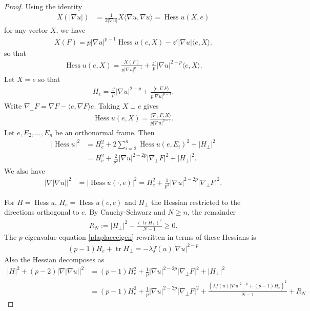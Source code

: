 \documentclass[11pt]{amsart}
\DeclareMathOperator{\Ric}{Ric}
\DeclareMathOperator{\tr}{tr}
\DeclareMathOperator{\Hess}{Hess}
\theoremstyle{definition}
\begin{document}
\begin{proof}
 Using the identity
 \begin{align*}
     X(|\nabla u|)&=\frac{1}{2|\nabla u|}X\langle \nabla u,\nabla u\rangle =\Hess u(X,e)
 \end{align*}
for any vector $X$, we have
\begin{align*}
    X(F)=p|\nabla u|^{p-1}\Hess u(e,X)-z'|\nabla u|\langle e,X\rangle. 
\end{align*}
so that
\begin{align*}
    \Hess u(e,X) = \frac{X(F)}{p|\nabla u|^{p-1}}+\frac{z'}{p}|\nabla u|^{2-p}\langle e,X\rangle.
\end{align*}
Let $X=e$ so that
\begin{align*}
    H_e =\frac{z'}{p}|\nabla u|^{2-p}+\frac{\langle e,\nabla F\rangle}{p|\nabla u|^{p-1}}.
\end{align*}
Write $\nabla_\perp F=\nabla F-\langle e,\nabla F\rangle e.$ Taking $X\perp e$ gives
\begin{align*}
    \Hess u(e,X) = \frac{\langle \nabla_\perp F,X\rangle}{p|\nabla u|^{p-1}}.
\end{align*}
Let $e,E_2,\ldots, E_n$ be an orthonormal frame.  Then
\begin{align*}
    |\Hess u|^2&=H_e^2+2\sum_{i=2}^n\Hess u(e,E_i)^2+|H_\perp|^2\\
    &=H_e^2+\frac{2}{p^2}|\nabla u|^{2-2p}|\nabla_\perp F|^2+|H_\perp|^2.
\end{align*}
We also have
\begin{align*}
    |\nabla |\nabla u||^2 &= |\Hess u(\cdot,e)|^2= H_e^2+\frac{1}{p^2}|\nabla u|^{2-2p}|\nabla_\perp F|^2.
\end{align*}


For $H=\Hess u$, $H_e=\Hess u(e,e)$ and $H_\perp$ the Hessian restricted to the directions orthogonal to $e$.  By Cauchy-Schwarz and $N\geq n$, the remainder
\begin{align*}
R_N:=|H_\perp|^2-\frac{(\tr H_\perp)^2}{N-1} \geq 0.
\end{align*}
The $p$-eigenvalue equation \eqref{plaplaceeigen} rewritten in terms of these Hessians is
\begin{align*}
    (p-1)H_e+\tr H_\perp =-\lambda f(u)|\nabla u|^{2-p}
\end{align*}
Also the Hessian decomposes as
\begin{align*}
|H|^2+(p-2)|\nabla |\nabla u||^2&=(p-1)H^2_e+\frac{1}{p}|\nabla u|^{2-2p}|\nabla_\perp F|^2+|H_\perp|^2 \\
&=(p-1)H_e^2+\frac{1}{p}|\nabla u|^{2-2p}|\nabla_\perp F|^2+\frac{(\lambda f(u)|\nabla u|^{2-p}+(p-1)H_e)^2}{N-1}+R_N
\end{align*}


\end{proof}
\end{document}
